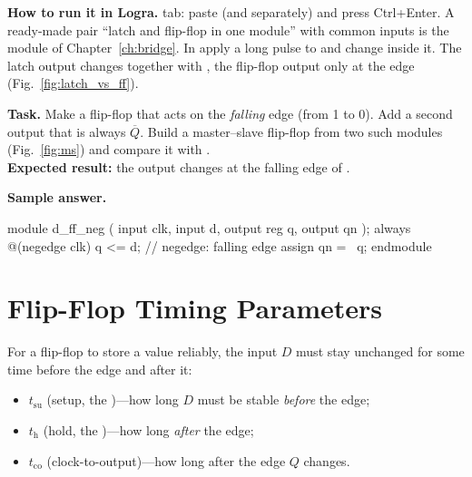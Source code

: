 \textbf{How to run it in Logra.}  tab: paste  (and
 separately) and press Ctrl+Enter. A ready-made pair ``latch and
flip-flop in one module'' with common inputs is the module 
of Chapter~\ref{ch:bridge}. In  apply a long pulse to
 and change  inside it. The latch output changes together with
, the flip-flop output only at the edge
(Fig.~\ref{fig:latch_vs_ff}).

\begin{diybox}
\textbf{Task.}  Make a flip-flop that acts on the \emph{falling} edge
(from 1 to 0).  Add a second output  that is always
$\overline{Q}$.  Build a master--slave flip-flop from two such modules
(Fig.~\ref{fig:ms}) and compare it with .\\
\textbf{Expected result:} the output changes at the falling edge of .
\end{diybox}

\textbf{Sample answer.}
\begin{vcode}
module d_ff_neg (
    input      clk,
    input      d,
    output reg q,
    output     qn
);
    always @(negedge clk) q <= d;   // negedge: falling edge
    assign qn = ~q;
endmodule
\end{vcode}

\section{Flip-Flop Timing Parameters}

For a flip-flop to store a value reliably, the input $D$ must stay unchanged for
some time before the edge and after it:
\begin{itemize}
  \item $t_\text{su}$ (setup, the )---how long $D$ must
        be stable \emph{before} the edge;
  \item $t_\text{h}$ (hold, the )---how long \emph{after} the edge;
  \item $t_\text{co}$ (clock-to-output)---how long after the edge $Q$ changes.
\end{itemize}

